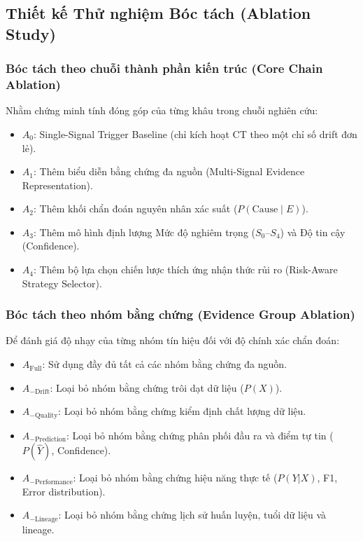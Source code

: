 \subsection{Thiết kế Thử nghiệm Bóc tách (Ablation Study)}

\subsubsection{Bóc tách theo chuỗi thành phần kiến trúc (Core Chain Ablation)}
Nhằm chứng minh tính đóng góp của từng khâu trong chuỗi nghiên cứu:
\begin{itemize}
  \item $A_0$: Single-Signal Trigger Baseline (chỉ kích hoạt CT theo một chỉ số drift đơn lẻ).
  \item $A_1$: Thêm biểu diễn bằng chứng đa nguồn (Multi-Signal Evidence Representation).
  \item $A_2$: Thêm khối chẩn đoán nguyên nhân xác suất ($P(\text{Cause} \mid E)$).
  \item $A_3$: Thêm mô hình định lượng Mức độ nghiêm trọng ($S_0$--$S_4$) và Độ tin cậy (Confidence).
  \item $A_4$: Thêm bộ lựa chọn chiến lược thích ứng nhận thức rủi ro (Risk-Aware Strategy Selector).
\end{itemize}

\subsubsection{Bóc tách theo nhóm bằng chứng (Evidence Group Ablation)}
Để đánh giá độ nhạy của từng nhóm tín hiệu đối với độ chính xác chẩn đoán:
\begin{itemize}
  \item $A_\text{Full}$: Sử dụng đầy đủ tất cả các nhóm bằng chứng đa nguồn.
  \item $A_{-\text{Drift}}$: Loại bỏ nhóm bằng chứng trôi dạt dữ liệu ($P(X)$).
  \item $A_{-\text{Quality}}$: Loại bỏ nhóm bằng chứng kiểm định chất lượng dữ liệu.
  \item $A_{-\text{Prediction}}$: Loại bỏ nhóm bằng chứng phân phối đầu ra và điểm tự tin ($P(\hat{Y})$, Confidence).
  \item $A_{-\text{Performance}}$: Loại bỏ nhóm bằng chứng hiệu năng thực tế ($P(Y|X)$, F1, Error distribution).
  \item $A_{-\text{Lineage}}$: Loại bỏ nhóm bằng chứng lịch sử huấn luyện, tuổi dữ liệu và lineage.
\end{itemize}

